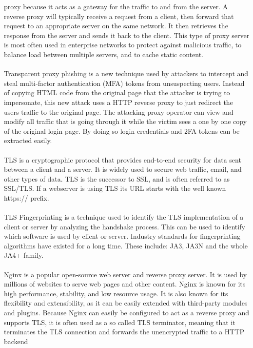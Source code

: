 \documentclass[12pt]{report}
\begin{document}
proxy because it acts as a gateway for the traffic to and from the server. A
reverse proxy will typically receive a request from a client, then forward that
request to an appropriate server on the same network. It then retrieves the
response from the server and sends it back to the client. This type of proxy server
is most often used in enterprise networks to protect against malicious traffic,
to balance load between multiple servers, and to cache static content. \\ \\
Transparent proxy phishing is a new technique used by attackers to intercept
and steal multi-factor authentication (MFA) tokens from unsuspecting users. Instead
of copying HTML code from the original page that the attacker is trying to impersonate,
this new attack uses a HTTP reverse proxy to just redirect the users traffic
to the original page. The attacking proxy operator can view and modify all traffic
that is going through it while the victim sees a one by one copy of the original
login page. By doing so login credentials and 2FA tokens can be extracted
easily. \\ \\ TLS is a cryptographic protocol that provides end-to-end security
for data sent between a client and a server. It is widely used to secure web
traffic, email, and other types of data. TLS is the successor to SSL, and is
often referred to as SSL/TLS. If a webserver is using TLS its URL starts with the
well known https:// prefix. \\ \\ TLS Fingerprinting is a technique used to identify
the TLS implementation of a client or server by analyzing the handshake process.
This can be used to identify which software is used by client or server. Industry
standards for fingerprinting algorithms have existed for a long time. These
include: JA3, JA3N and the whole JA4+ family. \\ \\
Nginx is a popular open-source web server and reverse proxy server. It is used by
millions of websites to serve web pages and other content. Nginx is known for its
high performance, stability, and low resource usage. It is also known for its
flexibility and extensibility, as it can be easily extended with third-party modules
and plugins. Because Nginx can easily be configured to act as a reverse proxy and
supports TLS, it is often used as a so called TLS terminator, meaning that it
terminates the TLS connection and forwards the unencrypted traffic to a HTTP backend
\end{document}

